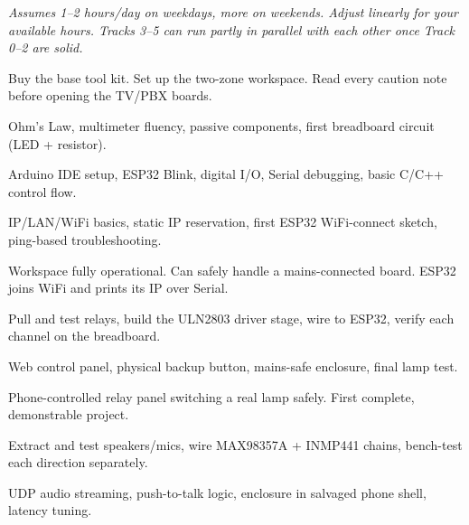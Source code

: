 

{\small\itshape\color{arligray} Assumes 1--2 hours/day on weekdays, more on weekends. Adjust linearly for your available hours. Tracks 3--5 can run partly in parallel with each other once Track 0--2 are solid.}


  {Buy the base tool kit. Set up the two-zone workspace. Read every caution note before opening the TV/PBX boards.}

  {Ohm's Law, multimeter fluency, passive components, first breadboard circuit (LED + resistor).}

  {Arduino IDE setup, ESP32 Blink, digital I/O, Serial debugging, basic C/C++ control flow.}

  {IP/LAN/WiFi basics, static IP reservation, first ESP32 WiFi-connect sketch, ping-based troubleshooting.}

  {Workspace fully operational. Can safely handle a mains-connected board. ESP32 joins WiFi and prints its IP over Serial.}


  {Pull and test relays, build the ULN2803 driver stage, wire to ESP32, verify each channel on the breadboard.}

  {Web control panel, physical backup button, mains-safe enclosure, final lamp test.}

  {Phone-controlled relay panel switching a real lamp safely. First complete, demonstrable project.}


  {Extract and test speakers/mics, wire MAX98357A + INMP441 chains, bench-test each direction separately.}

  {UDP audio streaming, push-to-talk logic, enclosure in salvaged phone shell, latency tuning.}

